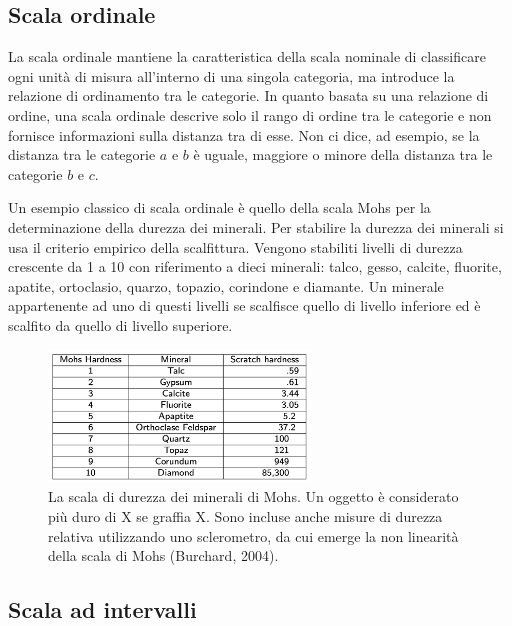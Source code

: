 \documentclass[
  letterpaper,
  krantz2]{{[}./krantz{]}}
\begin{document}
\subsection{Scala ordinale}\label{scala-ordinale}

La scala ordinale mantiene la caratteristica della scala nominale di
classificare ogni unità di misura all'interno di una singola categoria,
ma introduce la relazione di ordinamento tra le categorie. In quanto
basata su una relazione di ordine, una scala ordinale descrive solo il
rango di ordine tra le categorie e non fornisce informazioni sulla
distanza tra di esse. Non ci dice, ad esempio, se la distanza tra le
categorie \(a\) e \(b\) è uguale, maggiore o minore della distanza tra
le categorie \(b\) e \(c\).

Un esempio classico di scala ordinale è quello della scala Mohs per la
determinazione della durezza dei minerali. Per stabilire la durezza dei
minerali si usa il criterio empirico della scalfittura. Vengono
stabiliti livelli di durezza crescente da 1 a 10 con riferimento a dieci
minerali: talco, gesso, calcite, fluorite, apatite, ortoclasio, quarzo,
topazio, corindone e diamante. Un minerale appartenente ad uno di questi
livelli se scalfisce quello di livello inferiore ed è scalfito da quello
di livello superiore.

\begin{figure}[H]

{\centering \includegraphics[width=0.62\textwidth,height=\textheight]{chapters/key_notions/../../figures/mohs.png}

}

\caption{La scala di durezza dei minerali di Mohs. Un oggetto è
considerato più duro di X se graffia X. Sono incluse anche misure di
durezza relativa utilizzando uno sclerometro, da cui emerge la non
linearità della scala di Mohs (Burchard, 2004).}

\end{figure}%

\subsection{Scala ad intervalli}\label{scala-ad-intervalli}
\end{document}
